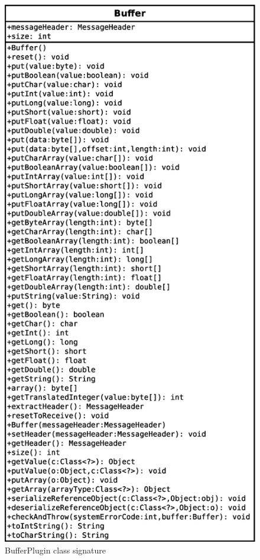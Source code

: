 \begin{figure}[ht]
\caption{BufferPlugin class signature}
\center
\label{fig:buffer_class}
\includegraphics[scale=0.35]{buffer.eps}
\end{figure}

